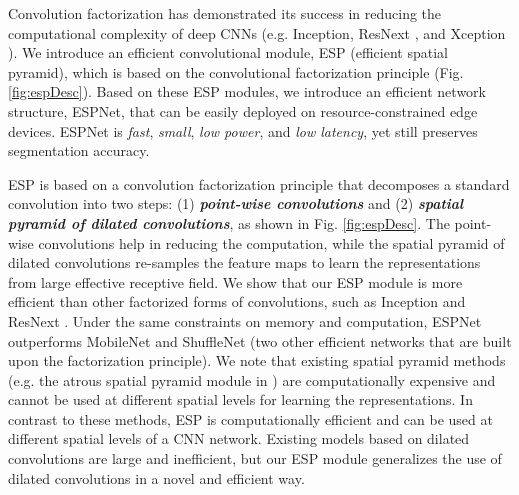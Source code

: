 \documentclass[runningheads]{llncs}
\def\Fig{Fig. }
\begin{document}
Convolution factorization has demonstrated its success in reducing the computational complexity of deep CNNs (e.g. Inception\cite{szegedy2015going,szegedy2016rethinking,SzegedyIV16InceptionV4},  ResNext \cite{xie2017aggregated}, and Xception \cite{chollet2016xception}). We introduce an efficient convolutional module, ESP (efficient spatial pyramid),  which is based on the convolutional factorization principle (\Fig \ref{fig:espDesc}). Based on these ESP modules, we introduce an efficient network structure, ESPNet, that can be easily deployed on resource-constrained edge devices. ESPNet is \textit{fast}, \textit{small}, \textit{low power}, and \textit{low latency}, yet still preserves segmentation accuracy.


ESP is based on a convolution factorization principle that decomposes a standard convolution into two steps: (1) \textbf{\textit{point-wise convolutions}} and (2) \textbf{\textit{spatial pyramid of dilated convolutions}}, as shown in \Fig \ref{fig:espDesc}. The point-wise convolutions help in reducing the computation, while the spatial pyramid of dilated convolutions re-samples the feature maps to learn the representations from large effective receptive field. We show that our ESP module is more efficient than other factorized forms of convolutions, such as Inception \cite{szegedy2015going,szegedy2016rethinking,SzegedyIV16InceptionV4} and  ResNext \cite{xie2017aggregated}. Under the same constraints on memory and computation, ESPNet outperforms  MobileNet \cite{howard2017mobilenets} and ShuffleNet \cite{zhang2017shufflenet} (two other efficient networks that are built upon the factorization principle). We note that existing spatial pyramid methods (e.g. the atrous spatial pyramid module in \cite{chen2016deeplab}) are computationally expensive and cannot be used at different spatial levels for learning the representations. In contrast to these methods, ESP is computationally efficient and can be used at different spatial levels of a CNN network. Existing models based on dilated convolutions \cite{zhao2017pyramid,chen2016deeplab,yu2015multi,yu2017dilated} are large and inefficient, but our ESP module generalizes the use of dilated convolutions in a novel and efficient way.   
\end{document}
